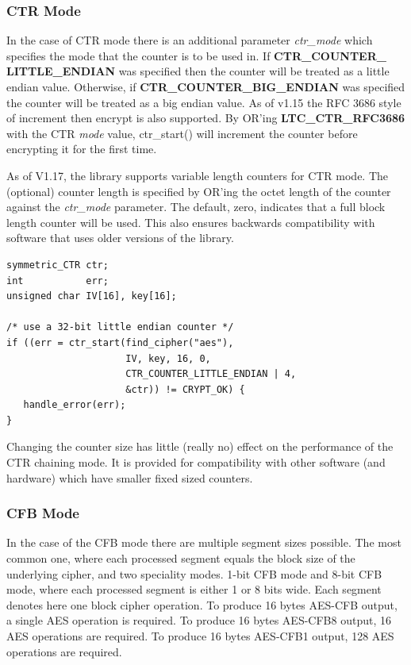 \documentclass[synpaper]{book}
\begin{document}
\subsubsection{CTR Mode}
In the case of CTR mode there is an additional parameter \textit{ctr\_mode} which specifies the mode that the counter is to be used in.
If \textbf{CTR\_COUNTER\_ LITTLE\_ENDIAN} was specified then the counter will be treated as a little endian value.  Otherwise, if
\textbf{CTR\_COUNTER\_BIG\_ENDIAN} was specified the counter will be treated as a big endian value.  As of v1.15 the RFC 3686 style of
increment then encrypt is also supported.  By OR'ing \textbf{LTC\_CTR\_RFC3686} with the CTR \textit{mode} value, ctr\_start() will increment
the counter before encrypting it for the first time.

As of V1.17, the library supports variable length counters for CTR mode.  The (optional) counter length is specified by OR'ing the octet
length of the counter against the \textit{ctr\_mode} parameter.  The default, zero, indicates that a full block length counter will be used.  This also
ensures backwards compatibility with software that uses older versions of the library.

\begin{small}
\begin{verbatim}
symmetric_CTR ctr;
int           err;
unsigned char IV[16], key[16];

/* use a 32-bit little endian counter */
if ((err = ctr_start(find_cipher("aes"),
                     IV, key, 16, 0,
                     CTR_COUNTER_LITTLE_ENDIAN | 4,
                     &ctr)) != CRYPT_OK) {
   handle_error(err);
}
\end{verbatim}
\end{small}

Changing the counter size has little (really no) effect on the performance of the CTR chaining mode.  It is provided for compatibility
with other software (and hardware) which have smaller fixed sized counters.

\subsubsection{CFB Mode}

In the case of the CFB mode there are multiple segment sizes possible.  The most common one, where each processed segment equals the
block size of the underlying cipher, and two speciality modes. 1-bit CFB mode and 8-bit CFB mode, where each processed segment is
either 1 or 8 bits wide.  Each segment denotes here one block cipher operation.
To produce 16 bytes AES-CFB output, a single AES operation is required.
To produce 16 bytes AES-CFB8 output, 16 AES operations are required.
To produce 16 bytes AES-CFB1 output, 128 AES operations are required.
\end{document}
